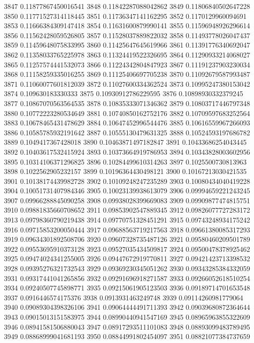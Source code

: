 3847 0.11877867450016541
3848 0.11842287088042862
3849 0.11806840502647228
3850 0.11771527314118445
3851 0.11736347141162295
3852 0.1170129960094691
3853 0.11666384309147418
3854 0.11631600879990141
3855 0.11596948926296614
3856 0.11562428059526805
3857 0.11528037889822032
3858 0.11493778026047437
3859 0.11459648075833995
3860 0.11425647645619966
3861 0.11391776340692047
3862 0.11358033765225978
3863 0.11324419522326695
3864 0.11290933214068027
3865 0.11257574441532073
3866 0.11224342804847923
3867 0.11191237903230034
3868 0.11158259335016255
3869 0.11125406697705238
3870 0.11092679587993487
3871 0.11060077601812039
3872 0.11027600334362524
3873 0.10995247380153042
3874 0.109630183330333
3875 0.10930912786229595
3876 0.10898930332379245
3877 0.10867070563564535
3878 0.10835333071346362
3879 0.10803717446797348
3880 0.10772223280534649
3881 0.10740850162752176
3882 0.10709597683252564
3883 0.10678465431478629
3884 0.10647452996544476
3885 0.10616559967266093
3886 0.10585785932191642
3887 0.10555130479631325
3888 0.10524593197686782
3889 0.1049417367428018
3890 0.10463871497182847
3891 0.10433686254043445
3892 0.10403617532415924
3893 0.10373664919786953
3894 0.10343828003602956
3895 0.10314106371296825
3896 0.10284499610314263
3897 0.1025500730813963
3898 0.1022562905232157
3899 0.10196364430498121
3900 0.10167213030421535
3901 0.10138174439982728
3902 0.10109248247235289
3903 0.10080434040419228
3904 0.10051731407984346
3905 0.10023139938613079
3906 0.09994659221243245
3907 0.09966288845090258
3908 0.09938028399669083
3909 0.09909877474815751
3910 0.09881835660708652
3911 0.09853902547889345
3912 0.09826077727283172
3913 0.09798360790219438
3914 0.09770751328451291
3915 0.09743248934175242
3916 0.09715853200050444
3917 0.09688563719217563
3918 0.09661380085317293
3919 0.09634301892508706
3920 0.09607328735487126
3921 0.09580460209501789
3922 0.09553695910373128
3923 0.09527035434509817
3924 0.09500478378925462
3925 0.09474024341255005
3926 0.09447672919770811
3927 0.09421423713398532
3928 0.09395276321732543
3929 0.09369230345051262
3930 0.09343285384332059
3931 0.09317441041265856
3932 0.09291696918271587
3933 0.09266052618510254
3934 0.09240507745898771
3935 0.09215061905123503
3936 0.09189714701653548
3937 0.0916446574175376
3938 0.0913931463249748
3939 0.09114260981779064
3940 0.09089304398326106
3941 0.09064444491711393
3942 0.09039680872364644
3943 0.09015013151583975
3944 0.08990440941547169
3945 0.08965963855322609
3946 0.08941581506880043
3947 0.08917293511101083
3948 0.08893099483789495
3949 0.08868999041681193
3950 0.08844991802454097
3951 0.08821077384737659
